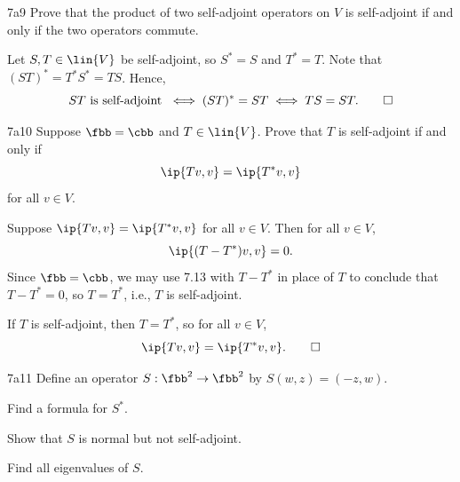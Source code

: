 \begin{exercise}{7a9}
    Prove that the product of two self-adjoint operators on $V$ is self-adjoint if and only if the two operators commute.
\end{exercise}

\begin{sol}
    Let $S, T \in \lin{V}$ be self-adjoint, so $S^\ast = S$ and $T^\ast = T$.
    Note that $(ST)^\ast = T^\ast S^\ast = TS$.
    Hence,
    \[
        ST \text{ is self-adjoint } \iff (ST)^\ast = ST \iff TS = ST. \qedhere
    \]
\end{sol}

\begin{exercise}{7a10}
    Suppose $\fbb = \cbb$ and $T \in \lin{V}$.
    Prove that $T$ is self-adjoint if and only if
    \[
        \ip{Tv, v} = \ip{T^\ast v, v}
    \]
    for all $v \in V$.
\end{exercise}

\begin{soliff}
    \rightimp Suppose $\ip{Tv, v} = \ip{T^\ast v, v}$ for all $v \in V$.
    Then for all $v \in V$,
    \[
        \ip{(T - T^\ast)v, v} = 0.
    \]
    Since $\fbb = \cbb$, we may use 7.13 with $T - T^\ast$ in place of $T$ to conclude that $T - T^\ast = 0$, so $T = T^\ast$, i.e., $T$ is self-adjoint.

    \leftimp If $T$ is self-adjoint, then $T = T^\ast$, so for all $v \in V$,
    \[
        \ip{Tv, v} = \ip{T^\ast v, v}. \qedhere
    \]
\end{soliff}

\begin{exercise}{7a11}
    Define an operator $S : \fbb^2 \to \fbb^2$ by $S(w, z) = (-z, w)$.
    \begin{subexercises}
        \item Find a formula for $S^\ast$.
        \item Show that $S$ is normal but not self-adjoint.
        \item Find all eigenvalues of $S$.
    \end{subexercises}
\end{exercise}

